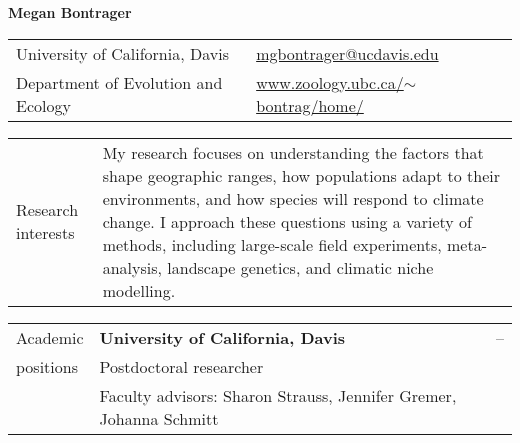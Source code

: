 \documentclass[letterpaper,11pt,oneside]{article}
\begin{document}



\noindent  \LARGE{\textbf{Megan Bontrager}} 

\normalsize

\bigskip

\noindent \begin{tabular}{@{} p{8cm} >{\raggedleft\arraybackslash}p{8.11cm}}
University of California, Davis & {\href{mailto:mgbontrager@ucdavis.edu}{mgbontrager@ucdavis.edu}} \\
Department of Evolution and Ecology & {\href{www.zoology.ubc.ca/$\sim$bontrag/home/}{www.zoology.ubc.ca/$\sim$bontrag/home/}} \\
\end{tabular}
\vspace{1em}


\noindent\hrulefill 

\bigskip
\bigskip



\noindent \begin{tabular}{@{} p{3cm} p{13.11cm}}
\Large{Research interests} & My research focuses on understanding the factors that shape geographic ranges, how populations adapt to their environments, and how species will respond to climate change. I approach these questions using a variety of methods, including large-scale field experiments, meta-analysis, landscape genetics, and climatic niche modelling. \\
\end{tabular}
\bigskip



\noindent \begin{tabular}{@{} p{3cm} p{11.21cm} >{\raggedleft\arraybackslash}p{1.7cm}}
\Large{Academic}    & \textbf{University of California, Davis} & 2018--\hspace*{0.8cm} \\
\Large{positions}   & Postdoctoral researcher & \\
& \raggedright{Faculty advisors: Sharon Strauss, Jennifer Gremer, Johanna Schmitt} & \\
\end{tabular}
\bigskip


\end{document}
